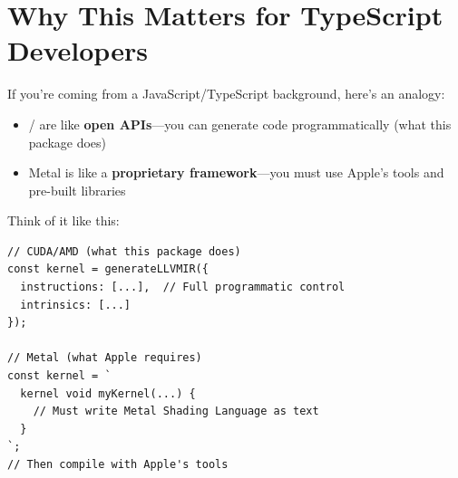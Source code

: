 \section{Why This Matters for TypeScript Developers}

If you're coming from a JavaScript/TypeScript background, here's an analogy:

\begin{itemize}[noitemsep]
  \item {}/ are like \textbf{open APIs}—you can generate code programmatically (what this package does)
  \item Metal is like a \textbf{proprietary framework}—you must use Apple's tools and pre-built libraries
\end{itemize}

Think of it like this:
\begin{lstlisting}[style=ts]
// CUDA/AMD (what this package does)
const kernel = generateLLVMIR({
  instructions: [...],  // Full programmatic control
  intrinsics: [...]
});

// Metal (what Apple requires)
const kernel = `
  kernel void myKernel(...) {
    // Must write Metal Shading Language as text
  }
`;
// Then compile with Apple's tools
\end{lstlisting}

